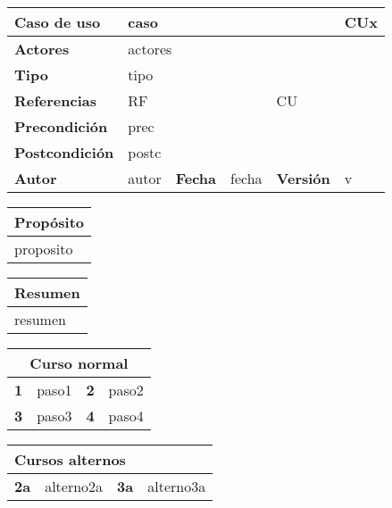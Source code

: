 \usepackage[table]{xcolor}

\begin{table}[H]
\centering
\begin{tabular}{|m{3cm}|m{4cm}|m{2cm}|m{2cm}|m{2cm}|m{1cm}|}
\hline
\textbf{Caso de uso} &  \multicolumn{4}{m{8cm}|}{caso} \vline &  \cellcolor{gray!40}CUx \\
\hline
\textbf{Actores} & \multicolumn{5}{m{8cm}|}{actores} \\
\hline
\textbf{Tipo} & \multicolumn{5}{m{8cm}|}{tipo} \\
\hline
\textbf{Referencias} &\multicolumn{3}{m{4cm}|}{RF} & \multicolumn{2}{m{4cm}|}{CU} \\
\hline
\textbf{Precondición} & \multicolumn{5}{m{8cm}|}{prec} \\
\hline
\textbf{Postcondición} & \multicolumn{5}{m{8cm}|}{postc} \\
\hline
\textbf{Autor} & autor & \textbf{Fecha} & fecha & \textbf{Versión} & v \\
\hline
\end{tabular}

\vspace{1cm}

\begin{tabular}{|m{16.2cm}|}
\hline
\textbf{Propósito} \\
\hline
proposito \\
\hline
\end{tabular}

\vspace{1cm}

\begin{tabular}{|m{16.2cm}|}
\hline
\textbf{Resumen} \\
\hline
resumen \\
\hline
\end{tabular}

\vspace{1cm}

\begin{tabular}{|m{4pt}|m{7.33cm}|m{4pt}|m{7.33cm}|}
\hline
\multicolumn{4}{|c|}{\textbf{Curso normal}} \\
\hline
\textbf{1} & paso1 & \textbf{2} & paso2 \\
\hline
\textbf{3} & paso3 & \textbf{4} & paso4 \\
\hline
\end{tabular}

\vspace{1cm}

\begin{tabular}{|m{10pt}|m{7.15cm}|m{10pt}|m{7.15cm}|}
\hline
\multicolumn{4}{|m{16.2cm}|}{\textbf{Cursos alternos}} \\
\hline
\textbf{2a} & alterno2a & \textbf{3a} & alterno3a  \\
\hline
\end{tabular}


\end{table}
